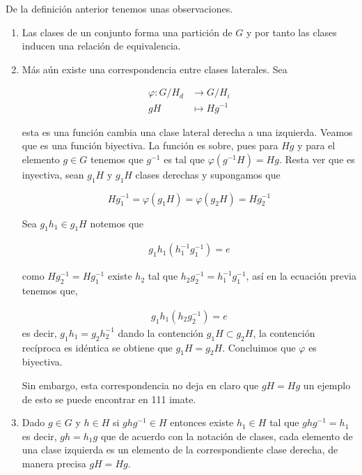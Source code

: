 \begin{ob}
De la definición anterior tenemos unas observaciones. 

\begin{enumerate}
	\item Las clases de un conjunto forma una partición de $G$ y por tanto las clases inducen una relación de equivalencia.
	
	\item Más aún existe una correspondencia entre clases laterales. Sea 
	
 	\begin{align*}
	\varphi:G/H_d & \to G/H_i \\
	gH & \mapsto Hg^{-1}
	\end{align*} 
 
esta es una función cambia una clase lateral derecha a una izquierda. Veamos que es una función biyectiva. La función es sobre, pues para $Hg$ y para el elemento $g \in G$ tenemos que $g^{-1}$ es tal que $\varphi(g^{-1}H)=Hg$. Resta ver que es inyectiva, sean $g_1H$ y $g_1H$ clases derechas y supongamos que
	
	 $$Hg_1^{-1}=\varphi(g_1H)=\varphi(g_2H)=Hg_2^{-1}$$ 
	
	Sea $g_1h_1 \in g_1H$ notemos que

	\begin{align*}
	g_1h_1(h_1^{-1}g_1^{-1})=e	
	\end{align*}
	
	como $Hg_2^{-1}=Hg_1^{-1}$ existe $h_2$ tal que $h_2g_2^{-1}=h_1^{-1}g_1^{-1}$, así en la ecuación previa tenemos que, 
	
	\begin{align*}
	g_1h_1(h_2g_2^{-1})=e	
	\end{align*} 
	es decir, $g_1h_1=g_2h_2^{-1}$ dando la contención $g_1H \subset g_2H$, la contención recíproca es idéntica se obtiene que $g_1H=g_2H$. Concluimos que $\varphi$ es biyectiva. 
	
	Sin embargo, esta correspondencia no deja en claro que $gH=Hg$ un ejemplo de esto se puede encontrar en 111 imate.
	
	 \item Dado $g \in G$ y $h \in H$ si $ghg^{-1} \in H$ entonces existe $h_1 \in H$ tal que $ghg^{-1}=h_1$ es decir, $gh=h_1g$  que de acuerdo con la notación de clases, cada elemento de una clase izquierda es un elemento de la correspondiente clase derecha, de manera precisa $gH=Hg$.
	 \end{enumerate}
	\end{ob}
	
